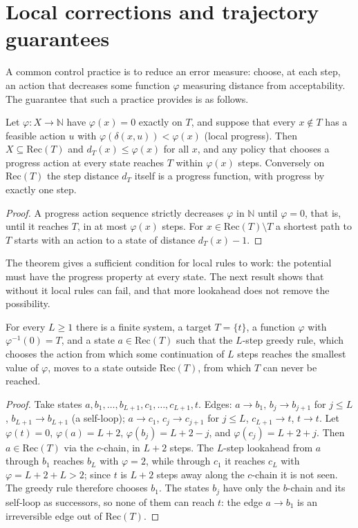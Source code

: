 \section{Local corrections and trajectory guarantees}

A common control practice is to reduce an error measure: choose, at each step, an action that decreases some function $\varphi$ measuring distance from acceptability. The guarantee that such a practice provides is as follows.

\begin{newresult}\label{prop:progress}
Let $\varphi:X\to\mathbb N$ have $\varphi(x)=0$ exactly on $T$, and suppose that every $x\notin T$ has a feasible action $u$ with $\varphi(\delta(x,u))<\varphi(x)$ (local progress). Then $X\subseteq\mathrm{Rec}(T)$ and $d_T(x)\le\varphi(x)$ for all $x$, and any policy that chooses a progress action at every state reaches $T$ within $\varphi(x)$ steps. Conversely on $\mathrm{Rec}(T)$ the step distance $d_T$ itself is a progress function, with progress by exactly one step.
\end{newresult}
\begin{proof}
A progress action sequence strictly decreases $\varphi$ in $\mathbb N$ until $\varphi=0$, that is, until it reaches $T$, in at most $\varphi(x)$ steps. For $x\in\mathrm{Rec}(T)\setminus T$ a shortest path to $T$ starts with an action to a state of distance $d_T(x)-1$.
\end{proof}

The theorem gives a sufficient condition for local rules to work: the potential must have the progress property at every state. The next result shows that without it local rules can fail, and that more lookahead does not remove the possibility.

\begin{newresult}\label{prop:greedy-fails}
For every $L\ge1$ there is a finite system, a target $T=\{t\}$, a function $\varphi$ with $\varphi^{-1}(0)=T$, and a state $a\in\mathrm{Rec}(T)$ such that the $L$-step greedy rule, which chooses the action from which some continuation of $L$ steps reaches the smallest value of $\varphi$, moves to a state outside $\mathrm{Rec}(T)$, from which $T$ can never be reached.
\end{newresult}
\begin{proof}
Take states $a,b_1,\dots,b_{L+1},c_1,\dots,c_{L+1},t$. Edges: $a\to b_1$, $b_j\to b_{j+1}$ for $j\le L$, $b_{L+1}\to b_{L+1}$ (a self-loop); $a\to c_1$, $c_j\to c_{j+1}$ for $j\le L$, $c_{L+1}\to t$, $t\to t$. Let $\varphi(t)=0$, $\varphi(a)=L+2$, $\varphi(b_j)=L+2-j$, and $\varphi(c_j)=L+2+j$. Then $a\in\mathrm{Rec}(T)$ via the $c$-chain, in $L+2$ steps. The $L$-step lookahead from $a$ through $b_1$ reaches $b_L$ with $\varphi=2$, while through $c_1$ it reaches $c_L$ with $\varphi=L+2+L>2$; since $t$ is $L+2$ steps away along the $c$-chain it is not seen. The greedy rule therefore chooses $b_1$. The states $b_j$ have only the $b$-chain and its self-loop as successors, so none of them can reach $t$: the edge $a\to b_1$ is an irreversible edge out of $\mathrm{Rec}(T)$.
\end{proof}

